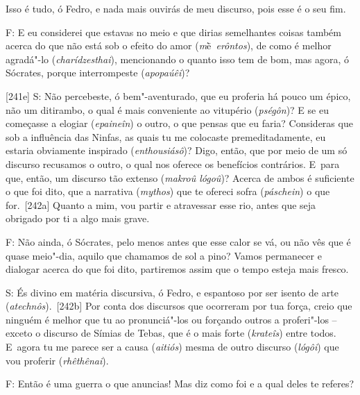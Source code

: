  

Isso é tudo, ó Fedro, e nada mais ouvirás de meu discurso, pois esse é o
seu fim.

 

F: E eu considerei que estavas no meio e que dirias semelhantes coisas
também acerca do que não está sob o efeito do amor
(\emph{m}ḕ\emph{~erôntos}), de como é melhor agradá"-lo
(\emph{charídzesthai}), mencionando o quanto isso tem de bom, mas agora,
ó Sócrates, porque interrompeste (\emph{apopaúêi})?

 

[241e] S: Não percebeste, ó bem"-aventurado, que eu proferia há pouco
um épico, não um ditirambo, o qual é mais conveniente ao vitupério
(\emph{pségôn})? E se eu começasse a elogiar (\emph{epaineîn}) o outro,
o que pensas que eu faria? Consideras que sob a influência das Ninfas,
as quais tu me colocaste premeditadamente, eu estaria obviamente
inspirado (\emph{enthousiásô})? Digo, então, que por meio de um só
discurso recusamos o outro, o qual nos oferece os benefícios contrários.
E~para que, então, um discurso tão extenso (\emph{makroû lógoû})? Acerca
de ambos é suficiente o que foi dito, que a narrativa (\emph{mythos})
que te ofereci sofra (\emph{páschein}) o que for.~[242a] Quanto a
mim, vou partir e atravessar esse rio, antes que seja obrigado por ti a
algo mais grave.

 

F: Não ainda, ó Sócrates, pelo menos antes que esse calor se vá, ou não
vês que é quase meio"-dia, aquilo que chamamos de sol a pino? Vamos
permanecer e dialogar acerca do que foi dito, partiremos assim que o
tempo esteja mais fresco.

 

S: És divino em matéria discursiva, ó Fedro, e espantoso por ser isento
de arte (\emph{atechnôs}).~[242b] Por conta dos discursos que
ocorreram por tua força, creio que ninguém é melhor que tu ao
pronunciá"-los ou forçando outros a proferi"-los -- exceto o discurso de
Símias de Tebas, que é o mais forte (\emph{krateîs}) entre todos. E~agora tu me parece ser a causa (\emph{aitiós}) mesma de outro discurso
(\emph{lógôi}) que vou proferir (\emph{rhêthênai}).

 

F: Então é uma guerra o que anuncias! Mas diz como foi e a qual deles te
referes?

 

